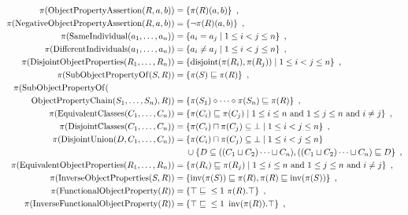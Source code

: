\begin{definition}
\begin{widepage}
\begin{align*}
      \pi(\op{ObjectPropertyAssertion}(R, a, b)) ={} & \{ \pi(R)(a, b) \} \enspace, \\
      \pi(\op{NegativeObjectPropertyAssertion}(R, a, b)) ={} & \{ \lnot \pi(R)(a, b) \} \enspace, \\
      \pi(\op{SameIndividual}(a_1, \dots, a_n)) ={} & \{ a_i = a_j \mid 1 \leq i < j \leq n \} \enspace, \\
      \pi(\op{DifferentIndividuals}(a_1, \dots, a_n)) ={} & \{ a_i \not= a_j \mid 1 \leq i < j \leq n \} \enspace, \\
      \pi(\op{DisjointObjectProperties}(R_1, \dots, R_n)) ={} & \{ \disjoint(\pi(R_i), \pi(R_j)) \mid 1 \leq i < j \leq n \} \enspace, \\
      \pi(\op{SubObjectPropertyOf}(S, R)) ={} & \{ \pi(S) \sqsubseteq \pi(R) \} \enspace, \\
      \pi(\op{SubObjectPropertyOf}( \qquad \qquad \qquad \qquad \quad & \\ \op{ObjectPropertyChain}(S_1, \dots, S_n), R)) ={} & \{ \pi(S_1) \circ \cdots \circ \pi(S_n) \sqsubseteq \pi(R) \} \enspace, \\
      \pi(\op{EquivalentClasses}(C_1, \dots, C_n)) ={} & \{ \pi(C_i) \sqsubseteq \pi(C_j) \mid 1 \leq i \leq n \text{ and } 1 \leq j \leq n \text{ and } i \not= j \} \enspace, \\
      \pi(\op{DisjointClasses}(C_1, \dots, C_n)) ={} & \{ \pi(C_i) \sqcap \pi(C_j) \subseteq \bot \mid 1 \leq i < j \leq n \} \enspace, \\
      \pi(\op{DisjointUnion}(D, C_1, \dots, C_n)) ={} & \{ \pi(C_i) \sqcap \pi(C_j) \subseteq \bot \mid 1 \leq i < j \leq n \} \\ & \cup \{ D \subseteq ((C_1 \sqcup C_2) \cdots \sqcup C_n), ((C_1 \sqcup C_2) \cdots \sqcup C_n) \sqsubseteq D \} \enspace, \\
      \pi(\op{EquivalentObjectProperties}(R_1, \dots, R_n)) ={} & \{ \pi(R_i) \sqsubseteq \pi(R_j) \mid 1 \leq i \leq n \text{ and } 1 \leq j \leq n \text{ and } i \not= j \} \enspace, \\
      \pi(\op{InverseObjectProperties}(S, R)) ={} & \{ \inv(\pi(S)) \sqsubseteq \pi(R), \pi(R) \sqsubseteq \inv(\pi(S)) \} \enspace, \\
      \pi(\op{FunctionalObjectProperty}(R)) ={} & \{ \top \sqsubseteq{} \less 1 {\pi(R).\top} \} \enspace, \\
      \pi(\op{InverseFunctionalObjectProperty}(R)) ={} & \{ \top \sqsubseteq{} \less 1 {\inv(\pi(R)).\top} \} \enspace, \\

\end{align*}
\end{widepage}
\end{definition}
